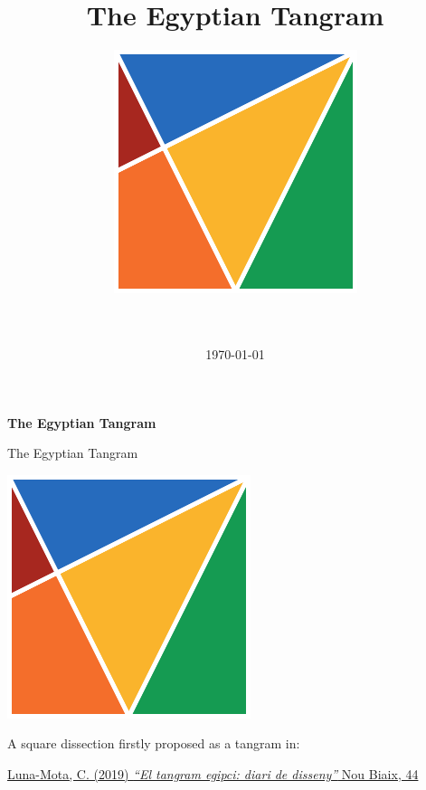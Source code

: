 \documentclass[14pt]{beamer}
\title{The Egyptian Tangram\vspace{-0.25em}}
\author{
    \includegraphics[height=18ex]{figures/figure001a.pdf}\\
    \;\;{\small \textcopyright\ \href{https://github.com/CarlosLunaMota}{Carlos Luna-Mota}}\\
    \vspace{0.55em}
    \href{https://mmaca.cat/}{\large \framebox{\textbf{mmaca}}}\\
    \vspace{-1.85em}}
\date{\today}
\begin{document}

    \begin{frame}
      \titlepage
    \end{frame}


    \begin{frame}{}
        \begin{center}
            \textbf{\huge The Egyptian Tangram}
        \end{center}
    \end{frame}


    \begin{frame}{The Egyptian Tangram}
        \begin{center}
            \includegraphics[height=20ex]{figures/figure001a.pdf} \\

            \bigskip

            A square dissection firstly proposed as a tangram in:

            \bigskip

            \href{https://publicacions.iec.cat/PopulaFitxa.do?idCatalogacio=33008}{\footnotesize Luna-Mota, C. (2019) \emph{``El tangram egipci: diari de disseny''} Nou Biaix, 44}
        \end{center}
    \end{frame}

\end{document}
